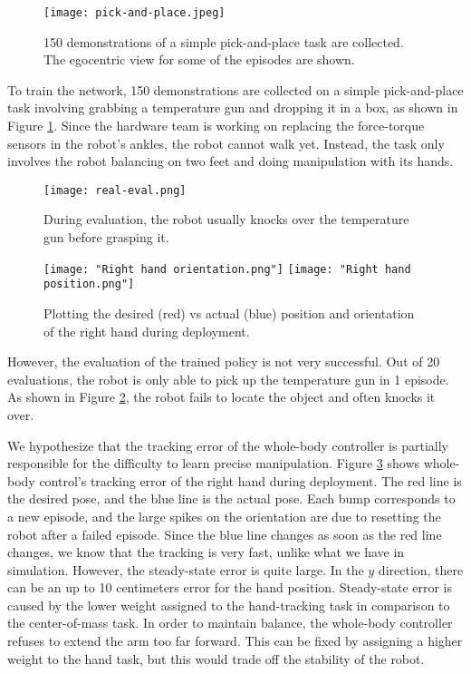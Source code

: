 \begin{figure}
	\centering
	\texttt{[image: pick-and-place.jpeg]}
    \caption{150 demonstrations of a simple pick-and-place task are collected. The egocentric view for some of the episodes are shown. }
    \label{fig:pick-and-place}
\end{figure}

To train the network, 150 demonstrations are collected on a simple pick-and-place task involving grabbing a temperature gun and dropping it in a box, as shown in Figure \ref{fig:pick-and-place}. Since the hardware team is working on replacing the force-torque sensors in the robot's ankles, the robot cannot walk yet. Instead, the task only involves the robot balancing on two feet and doing manipulation with its hands. 

\begin{figure}
	\centering
	\texttt{[image: real-eval.png]}
    \caption{During evaluation, the robot usually knocks over the temperature gun before grasping it.}
    \label{fig:real-eval}
\end{figure}
\begin{figure}
	\centering
	\texttt{[image: "Right hand orientation.png"]}
	\texttt{[image: "Right hand position.png"]}
    \caption{Plotting the desired (red) vs actual (blue) position and orientation of the right hand during deployment. }
    \label{fig:tracking-plot}
\end{figure}


However, the evaluation of the trained policy is not very successful. Out of 20 evaluations, the robot is only able to pick up the temperature gun in 1 episode. As shown in Figure \ref{fig:real-eval}, the robot fails to locate the object and often knocks it over. 

We hypothesize that the tracking error of the whole-body controller is partially responsible for the difficulty to learn precise manipulation. Figure \ref{fig:tracking-plot} shows whole-body control's tracking error of the right hand during deployment. The red line is the desired pose, and the blue line is the actual pose. Each bump corresponds to a new episode, and the large spikes on the orientation are due to resetting the robot after a failed episode. Since the blue line changes as soon as the red line changes, we know that the tracking is very fast, unlike what we have in simulation. However, the steady-state error is quite large. In the $y$ direction, there can be an up to 10 centimeters error for the hand position. Steady-state error is caused by the lower weight assigned to the hand-tracking task in comparison to the center-of-mass task. In order to maintain balance, the whole-body controller refuses to extend the arm too far forward. This can be fixed by assigning a higher weight to the hand task, but this would trade off the stability of the robot. 

